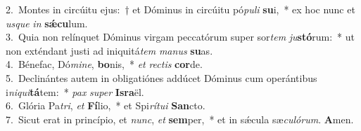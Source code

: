 {2.~}Montes in circúitu ejus:~† et Dóminus in circúitu pó\textit{pu}\textit{li} \textbf{su}i,~* ex hoc nunc et \textit{us}\textit{que} \textit{in} \textbf{sǽ}\textbf{cu}lum.\\
{3.~}Quia non relínquet Dóminus virgam peccatórum super sor\textit{tem} \textit{ju}\textbf{stó}rum:~* ut non exténdant justi ad iniquitá\textit{tem} \textit{ma}\textit{nus} \textbf{su}as.\\
{4.~}Bénefac, Dó\textit{mi}\textit{ne}, \textbf{bo}nis,~* \textit{et} \textit{re}\textit{ctis} \textbf{cor}de.\\
{5.~}Declinántes autem in obligatiónes addúcet Dóminus cum operántibus i\textit{ni}\textit{qui}\textbf{tá}tem:~* \textit{pax} \textit{su}\textit{per} \textbf{Is}\textbf{ra}ël.\\
{6.~}Glória Pa\textit{tri}, \textit{et} \textbf{Fí}lio,~* et Spi\textit{rí}\textit{tu}\textit{i} \textbf{San}cto.\\
{7.~}Sicut erat in princípio, et \textit{nunc}, \textit{et} \textbf{sem}per,~* et in sǽcula sæ\textit{cu}\textit{ló}\textit{rum}. \textbf{A}men.\\
